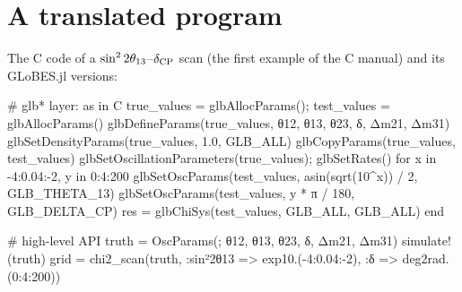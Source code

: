 \section{A translated program}

The C code of a $\sin^2 2\theta_{13}$--$\delta_\mathrm{CP}$ scan (the first example of the C manual)
and its GLoBES.jl versions:
\begin{julia}
# glb* layer: as in C
true_values = glbAllocParams(); test_values = glbAllocParams()
glbDefineParams(true_values, θ12, θ13, θ23, δ, Δm21, Δm31)
glbSetDensityParams(true_values, 1.0, GLB_ALL)
glbCopyParams(true_values, test_values)
glbSetOscillationParameters(true_values); glbSetRates()
for x in -4:0.04:-2, y in 0:4:200
    glbSetOscParams(test_values, asin(sqrt(10^x)) / 2, GLB_THETA_13)
    glbSetOscParams(test_values, y * π / 180, GLB_DELTA_CP)
    res = glbChiSys(test_values, GLB_ALL, GLB_ALL)
end

# high-level API
truth = OscParams(; θ12, θ13, θ23, δ, Δm21, Δm31)
simulate!(truth)
grid = chi2_scan(truth, :sin²2θ13 => exp10.(-4:0.04:-2), :δ => deg2rad.(0:4:200))
\end{julia}
